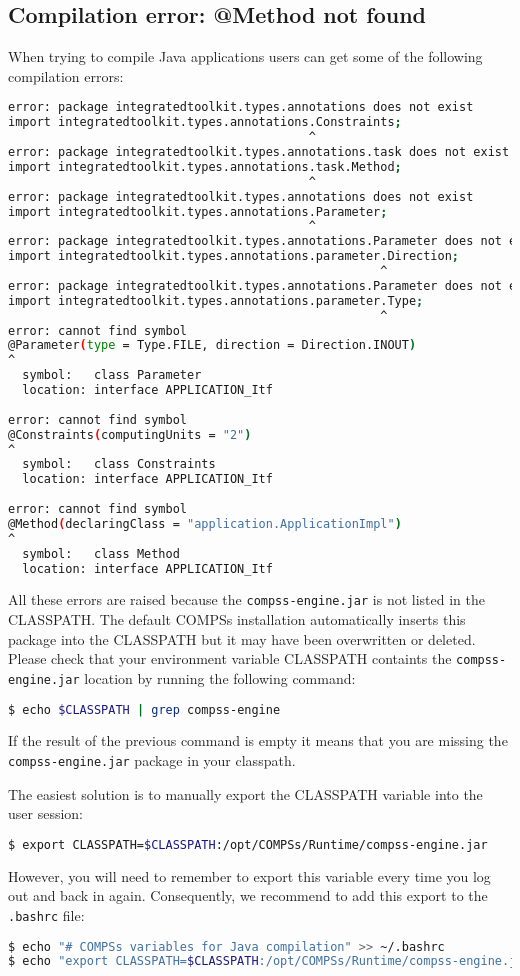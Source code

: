 \subsection{Compilation error: @Method not found}
When trying to compile Java applications users can get some of the following compilation errors:
\begin{lstlisting}[language=bash]
error: package integratedtoolkit.types.annotations does not exist
import integratedtoolkit.types.annotations.Constraints;
                                          ^
error: package integratedtoolkit.types.annotations.task does not exist
import integratedtoolkit.types.annotations.task.Method;
                                          ^
error: package integratedtoolkit.types.annotations does not exist
import integratedtoolkit.types.annotations.Parameter;
                                          ^
error: package integratedtoolkit.types.annotations.Parameter does not exist
import integratedtoolkit.types.annotations.parameter.Direction;
                                                    ^
error: package integratedtoolkit.types.annotations.Parameter does not exist
import integratedtoolkit.types.annotations.parameter.Type;
                                                    ^
error: cannot find symbol
@Parameter(type = Type.FILE, direction = Direction.INOUT)
^
  symbol:   class Parameter
  location: interface APPLICATION_Itf
  
error: cannot find symbol
@Constraints(computingUnits = "2")
^
  symbol:   class Constraints
  location: interface APPLICATION_Itf
  
error: cannot find symbol
@Method(declaringClass = "application.ApplicationImpl")
^
  symbol:   class Method
  location: interface APPLICATION_Itf
\end{lstlisting}

All these errors are raised because the \texttt{compss-engine.jar} is not listed in the CLASSPATH. The default COMPSs installation
automatically inserts this package into the CLASSPATH but it may have been overwritten or deleted. Please check that your 
environment variable CLASSPATH containts the \texttt{compss-engine.jar} location by running the following command:
\begin{lstlisting}[language=bash]
$ echo $CLASSPATH | grep compss-engine
\end{lstlisting}
If the result of the previous command is empty it means that you are missing the \texttt{compss-engine.jar} package in your classpath. 

The easiest solution is to manually export the CLASSPATH variable into the user session:
\begin{lstlisting}[language=bash]
$ export CLASSPATH=$CLASSPATH:/opt/COMPSs/Runtime/compss-engine.jar
\end{lstlisting}
However, you will need to remember to export this variable every time you log out and back in again. Consequently, we recommend to 
add this export to the \texttt{.bashrc} file:
\begin{lstlisting}[language=bash]
$ echo "# COMPSs variables for Java compilation" >> ~/.bashrc
$ echo "export CLASSPATH=$CLASSPATH:/opt/COMPSs/Runtime/compss-engine.jar" >> ~/.bashrc
\end{lstlisting}

